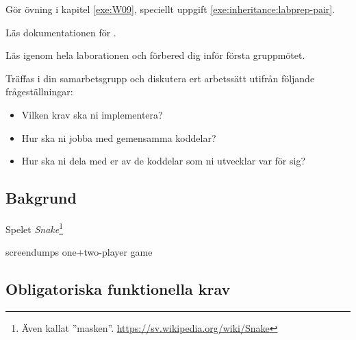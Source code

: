 
\Teamlab{\LabWeekNINE}

\begin{Goals}

\end{Goals}

\begin{Preparations}
\item Gör övning {\tt \ExeWeekNINE} i kapitel \ref{exe:W09}, speciellt uppgift \ref{exe:inheritance:labprep-pair}.
\item Läs dokumentationen för .
\item Läs igenom hela laborationen och förbered dig inför första gruppmötet.

\item Träffas i din samarbetsgrupp och diskutera ert arbetssätt utifrån följande frågeställningar:
\begin{itemize}
  \item Vilken krav ska ni implementera?
  \item Hur ska ni jobba med gemensamma koddelar?
  \item Hur ska ni dela med er av de koddelar som ni utvecklar var för sig?
\end{itemize}

\end{Preparations}

\subsection{Bakgrund}

Spelet \emph{Snake}\footnote{Även kallat ''masken''. \url{https://sv.wikipedia.org/wiki/Snake}}

\TODO screendumps one+two-player game
\subsection{Obligatoriska funktionella krav}

